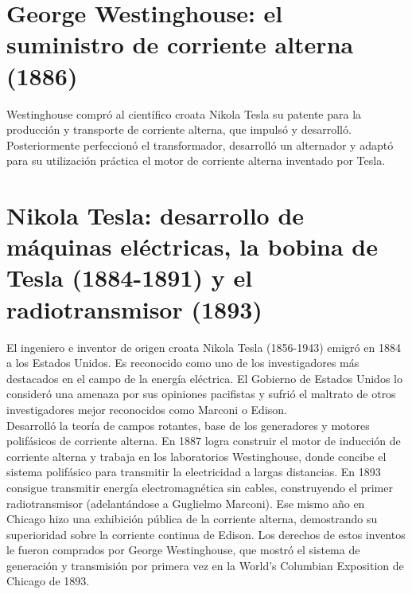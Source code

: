 \documentclass{article}
\begin{document}
\section{George Westinghouse: el suministro de corriente alterna (1886)}

Westinghouse compró al científico croata Nikola Tesla su patente para la producción y transporte de corriente alterna, que impulsó y desarrolló. Posteriormente perfeccionó el transformador, desarrolló un alternador y adaptó para su utilización práctica el motor de corriente alterna inventado por Tesla. \citep{HDE}\\


\section{Nikola Tesla: desarrollo de máquinas eléctricas, la bobina de Tesla (1884-1891) y el radiotransmisor (1893)}

El ingeniero e inventor de origen croata Nikola Tesla (1856-1943) emigró en 1884 a los Estados Unidos. Es reconocido como uno de los investigadores más destacados en el campo de la energía eléctrica. El Gobierno de Estados Unidos lo consideró una amenaza por sus opiniones pacifistas y sufrió el maltrato de otros investigadores mejor reconocidos como Marconi o Edison.\citep{HDE}\\

Desarrolló la teoría de campos rotantes, base de los generadores y motores polifásicos de corriente alterna. En 1887 logra construir el motor de inducción de corriente alterna y trabaja en los laboratorios Westinghouse, donde concibe el sistema polifásico para transmitir la electricidad a largas distancias. En 1893 consigue transmitir energía electromagnética sin cables, construyendo el primer radiotransmisor (adelantándose a Guglielmo Marconi). Ese mismo año en Chicago hizo una exhibición pública de la corriente alterna, demostrando su superioridad sobre la corriente continua de Edison. Los derechos de estos inventos le fueron comprados por George Westinghouse, que mostró el sistema de generación y transmisión por primera vez en la World's Columbian Exposition de Chicago de 1893. \citep{HDE}\\
\end{document}
